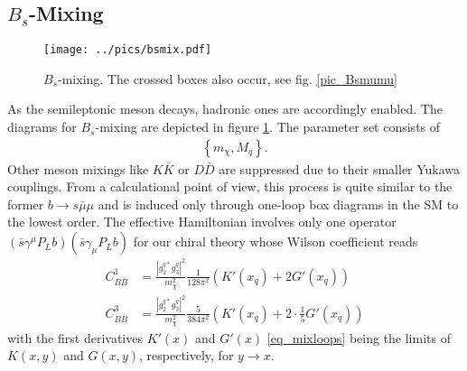 \subsection{$B_s$-Mixing}
\begin{figure}[t]
 \texttt{[image: ../pics/bsmix.pdf]}
 \caption{$B_s$-mixing. The crossed boxes also occur, see fig. \ref{pic_Bsmumu}}
 \label{pic_Bsmix}
\end{figure}
As the semileptonic meson decays, hadronic ones are accordingly enabled. The diagrams for $B_s$-mixing are depicted in figure \ref{pic_Bsmix}. 
The parameter set consists of
\begin{align}
 \left\{m_\chi,M_q\right\}.
\end{align}
Other
meson mixings like $K\bar K$ or $ D \bar D$ are suppressed due to their smaller Yukawa couplings. From a calculational point of view, this process is 
quite similar to the former $b\rightarrow s\bar\mu\mu$ and is induced only through one-loop box diagrams in the SM to the lowest order. The effective Hamiltonian
involves only one operator $(\bar s \gamma^\mu P_L b)(\bar s \gamma_\mu P_L b)$ for our chiral theory whose Wilson coefficient reads
\begin{align}
 C_{B\bar B}^1 &=  \frac{|g_2^{q*}g_3^q|^2}{m_\chi^2} \frac{1}{128\pi^2} \left(K'(x_q) + 2 G'(x_q)\right)\label{eq_WilsonMix1}\\
 C_{B\bar B}^3 &=  \frac{|g_2^{q*}g_3^q|^2}{m_\chi^2} \frac{5}{384\pi^2} \left(K'(x_q) + 2\cdot\frac15 G'(x_q)\right)
 \label{eq_WilsonMix3}
\end{align}
with the first derivatives $K'(x)$ and $G'(x)$ \eqref{eq_mixloops} being the limits of $K(x,y)$ and $G(x,y)$, respectively, for $y\rightarrow x$. 

